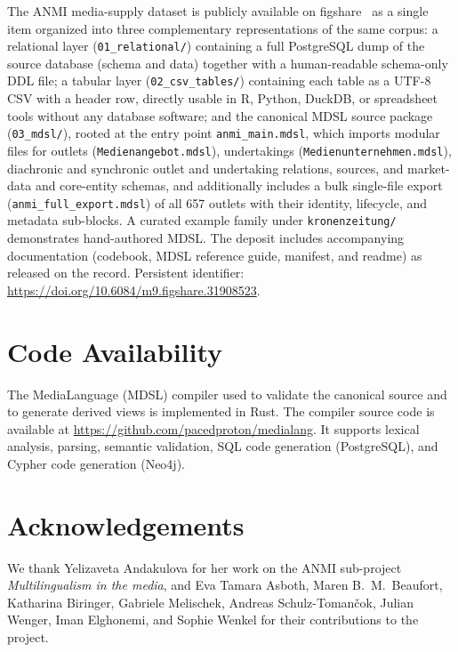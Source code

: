 \documentclass[11pt]{article}
\begin{document}
The ANMI media-supply dataset is publicly available on figshare~\cite{ANMIFigshare2026} as a single item organized into three complementary representations of the same corpus: a relational layer (\texttt{01\_relational/}) containing a full PostgreSQL dump of the source database (schema and data) together with a human-readable schema-only DDL file; a tabular layer (\texttt{02\_csv\_tables/}) containing each table as a UTF-8 CSV with a header row, directly usable in R, Python, DuckDB, or spreadsheet tools without any database software; and the canonical MDSL source package (\texttt{03\_mdsl/}), rooted at the entry point \texttt{anmi\_main.mdsl}, which imports modular files for outlets (\texttt{Medienangebot.mdsl}), undertakings (\texttt{Medienunternehmen.mdsl}), diachronic and synchronic outlet and undertaking relations, sources, and market-data and core-entity schemas, and additionally includes a bulk single-file export (\texttt{anmi\_full\_export.mdsl}) of all 657 outlets with their identity, lifecycle, and metadata sub-blocks. A curated example family under \texttt{kronenzeitung/} demonstrates hand-authored MDSL. The deposit includes accompanying documentation (codebook, MDSL reference guide, manifest, and readme) as released on the record. Persistent identifier: \url{https://doi.org/10.6084/m9.figshare.31908523}.

\section{Code Availability}

The MediaLanguage (MDSL) compiler used to validate the canonical source and to generate derived views is implemented in Rust. The compiler source code is available at \url{https://github.com/pacedproton/medialang}. It supports lexical analysis, parsing, semantic validation, SQL code generation (PostgreSQL), and Cypher code generation (Neo4j). 

\section*{Acknowledgements}


We thank Yelizaveta Andakulova for her work on the ANMI sub-project \emph{Multilingualism in the media}, and Eva Tamara Asboth, Maren B.~M.~Beaufort, Katharina Biringer, Gabriele Melischek, Andreas Schulz-Tomančok, Julian Wenger, Iman Elghonemi, and Sophie Wenkel for their contributions to the project.
\end{document}
